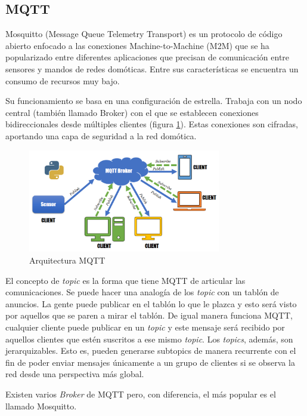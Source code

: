 \subsection{MQTT}

Mosquitto (Message Queue Telemetry Transport) es un protocolo de código abierto enfocado a las conexiones Machine-to-Machine (M2M) \cite{Vega:2016} que se ha popularizado entre diferentes aplicaciones que precisan de comunicación entre sensores y mandos de redes domóticas. Entre sus características se encuentra un consumo de recursos muy bajo.

Su funcionamiento se basa en una configuración de estrella. Trabaja con un nodo central (también llamado Broker) con el que se establecen conexiones bidireccionales desde múltiples clientes (figura \ref{fig:mqtt}). Estas conexiones son cifradas, aportando una capa de seguridad a la red domótica.

\begin{figure}[tb]
\centering
\includegraphics[width=0.75\textwidth]{figuras/mqtt.png}
\caption{Arquitectura MQTT}
\label{fig:mqtt}
\end{figure}

El concepto de \textit{topic} es la forma que tiene MQTT de articular las comunicaciones. Se puede hacer una analogía de los \textit{topic} con un tablón de anuncios. La gente puede publicar en el tablón lo que le plazca y esto será visto por aquellos que se paren a mirar el tablón. De igual manera funciona MQTT, cualquier cliente puede publicar en un \textit{topic} y este mensaje será recibido por aquellos clientes que estén suscritos a ese mismo \textit{topic}. Los \textit{topics}, además, son jerarquizables. Esto es, pueden generarse subtopics de manera recurrente con el fin de poder enviar mensajes únicamente a un grupo de clientes si se observa la red desde una perspectiva más global.

Existen varios \textit{Broker} de MQTT pero, con diferencia, el más popular es el llamado Mosquitto.

